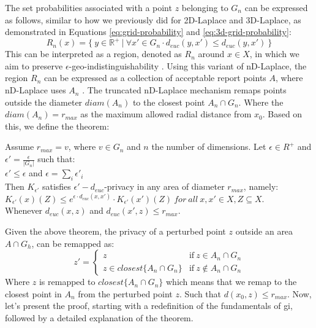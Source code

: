 The set probabilities associated with a point $z$ belonging to $G_n$ can be expressed as follows, similar to how we previously did for 2D-Laplace and 3D-Laplace, as demonstrated in Equations \ref{eq:grid-probability} and \ref{eq:3d-grid-probability}:
\begin{equation}
R_n(x) = \{ \ y \in \mathbb{R}^+ \ | \ \forall x' \in G_n \cdot d_{euc}(y, x') \leq d_{euc}(y, x') \ \}
\end{equation}
This can be interpreted as a region, denoted as $R_n$ around $x \in X$, in which we aim to preserve $\epsilon$-geo-indistinguishability \citep{9646489}.
Using this variant of nD-Laplace, the region $R_n$ can be expressed as a collection of acceptable report points $A$, where nD-Laplace uses $A_n$ \citep{DBLP:journals/corr/abs-1212-1984}.
The truncated nD-Laplace mechanism remaps points outside the diameter $diam(A_n)$ to the closest point $A_n \cap G_n$. 
Where the $diam(A_n) = r_{max}$ as the maximum allowed radial distance from $x_0$. \newline
Based on this, we define the theorem:
\begin{theorem}
Assume  $r_{max} = v$, where $v \in G_n$ and $n$ the number of dimensions. Let $\epsilon \in R^+$ and $\epsilon' = \frac{\epsilon}{|G_n|}$ such that: \\
  $\epsilon' \leq \epsilon$ and $\epsilon = \sum_i{\epsilon'_i}$ \\
  Then $K_{\epsilon'}$ satisfies $\epsilon'-d_{euc}$-privacy in any area of diameter $r_{max}$, namely: \\ 
  $K_{\epsilon'}(x)(Z) \leq e^{\epsilon \cdot d_{euc} (x, x')} \cdot K_{\epsilon'}(x')(Z) \ for \ all \ x, x' \in X, Z \subseteq X$.  \\
  Whenever $d_{euc}(x, z)$ and $d_{euc}(x', z) \leq r_{max}$.
  \label{theorem:nd-laplace-truncation}
\end{theorem}
Given the above theorem, the privacy of a perturbed point $z$ outside an area $A \cap G_h$, can be remapped as:
\begin{equation}
z' = 
\begin{cases}
        z & \text{if} \ z \in A_n \cap G_n \\ 
        z \in closest \{ A_n \cap G_n \}  & \text{if} \ z \notin A_n \cap G_n
    \end{cases}    
\end{equation}
Where $z$ is remapped to $closest \{ A_n \cap G_n \}$ which means that we remap to the closest point in $A_n$ from the perturbed point $z$. Such that $d(x_0, z) \leq r_{max}$.  \newline
Now, let's present the proof, starting with a redefinition of the fundamentals of \gls{gi}, followed by a detailed explanation of the theorem. \newline

